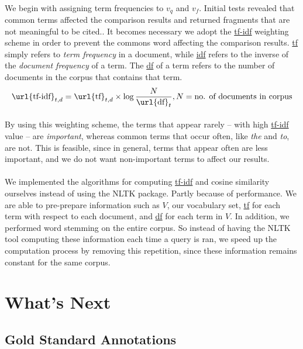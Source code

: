 \documentclass[12 pt]{article}
\begin{document}
\paragraph{}
We begin with assigning term frequencies to $v_q$ and $v_f$. Initial tests revealed that common terms affected the comparison results and returned fragments that are not meaningful to be cited.. It becomes necessary we adopt the \url{tf-idf} weighting scheme in order to prevent the commons word affecting the comparison results. \url{tf} simply refers to \textit{term frequency} in a document, while \url{idf} refers to the inverse of the \textit{document frequency} of a term. The \url{df} of a term refers to the number of documents in the corpus that contains that term.
\begin{equation}
\text{\url{tf-idf}}_{t,d} = \text{\url{tf}}_{t,d} \times \log{\frac{N}{\text{\url{df}}_t}}, N=\text{no. of documents in corpus}
\end{equation}
\paragraph{}
By using this weighting scheme, the terms that appear rarely -- with high \url{tf-idf} value -- are \textit{important}, whereas common terms that occur often, like \textit{the} and \textit{to}, are not. This is feasible, since in general, terms that appear often are less important, and we do not want non-important terms to affect our results.

\paragraph{}
We implemented the algorithms for computing \url{tf-idf} and cosine similarity ourselves instead of using the NLTK package. Partly because of performance. We are able to pre-prepare information such as $V$, our vocabulary set, \url{tf} for each term with respect to each document, and \url{df} for each term in $V$. In addition, we performed word stemming on the entire corpus. So instead of having the NLTK tool computing these information each time a query is ran, we speed up the computation process by removing this repetition, since these information remains constant for the same corpus.

\section{What's Next}
\label{whatsnext}
\subsection{Gold Standard Annotations}
\end{document}
